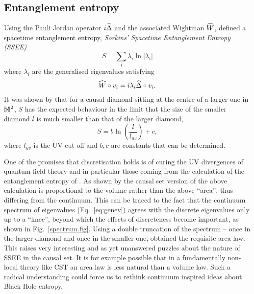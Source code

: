 \subsection{Entanglement entropy} 
\label{ssec:SSEE}
 
 Using
the Pauli Jordan operator $i\widehat \Delta$ and the associated Wightman  $\widehat W$, \cite{sorkinEE} defined a spacetime entanglement entropy, \emph{Sorkins' Spacetime Entanglement Entropy (SSEE)} 
\begin{equation} 
S = \sum_{i} \lambda_i \ln|\lambda_i|
\end{equation} 
where $\lambda_i$ are the  generalised eigenvalues satisfying 
\begin{equation} 
\widehat W\circ v_i = i \lambda_i \widehat \Delta \circ  v_i. 
\label{eq:genev} 
\end{equation} 
It was shown by \cite{yasamaneecont} that for a  causal diamond  sitting at  the centre of a larger
one  in $\mathbb M^2$, $S$ has the expected
behaviour in the limit that the size of the smaller diamond $l$ is much smaller than that of the larger diamond,    
\begin{equation} 
S=b \ln \left(\frac{l}{l_{uv}}\right) +c, 
\end{equation} 
where $l_{uv}$ is the UV cut-off and $b,c$ are constants that can be determined.  

 
One of the promises that discretisation holds is of curing the UV divergences of quantum field theory and in particular
those coming from  the calculation of the entanglement entropy of \cite{bklsEE}.  As shown by \cite{causetee} the
causal set version of the above calculation is proportional to the volume rather than
the above ``area'', thus differing from the continuum. This can be traced to the fact that the 
continuum spectrum of eigenvalues (Eq.~\ref{eq:genev})  agrees with the discrete eigenvalues only up to a 
``knee'', beyond  which the effects of discreteness become important, as shown in Fig.~\ref{spectrum.fig}.
Using a double truncation of the spectrum -- once in the larger diamond and once in the smaller one, \cite{causetee}
obtained the requisite area law. This raises
very interesting and as yet unanswered puzzles about the nature of SSEE in the causal set. It is for example possible that in a
fundamentally non-local theory like CST an area law is less natural than a volume law. Such a radical understanding could
force us to rethink continuum inspired ideas about Black Hole entropy. 

